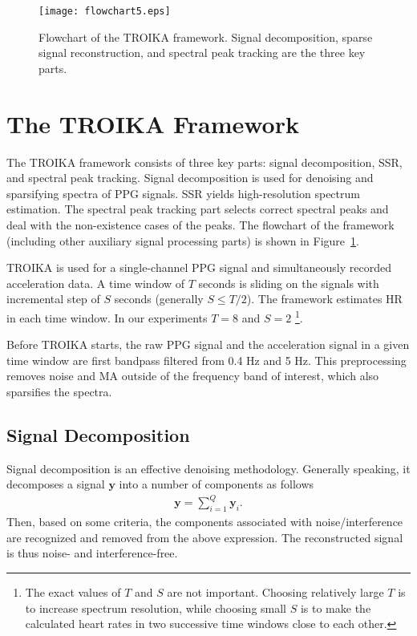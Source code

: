 \documentclass[10pt,twocolumn]{IEEEtran}
\begin{document}
\begin{figure}[t]
\centering
\texttt{[image: flowchart5.eps]}
\caption{Flowchart of the TROIKA framework. Signal decomposition, sparse signal reconstruction, and spectral peak tracking are the three key parts.}
\label{fig:framework}
\end{figure}









\section{The TROIKA Framework}
\label{sec:TROIKA}

The TROIKA framework consists of three key parts: signal decomposition, SSR, and spectral peak tracking. Signal decomposition is used for denoising and sparsifying spectra of PPG signals. SSR yields high-resolution spectrum estimation. The spectral peak tracking part selects correct spectral peaks and deal with the non-existence cases of the peaks. The flowchart of the framework (including other auxiliary signal processing parts) is shown in Figure~\ref{fig:framework}.


TROIKA is used for a single-channel PPG signal and simultaneously recorded acceleration data. A time window of $T$ seconds is sliding on the  signals with incremental step of $S$ seconds (generally $S \leq T/2$). The framework estimates HR in each time window. In our experiments $T=8$ and $S=2$ \footnote{The exact values of $T$ and $S$ are not important. Choosing relatively large $T$ is to increase spectrum resolution, while choosing small $S$ is to make the calculated heart rates in two successive time windows close to each other.}.

Before TROIKA starts, the raw PPG signal and the acceleration signal in a given time window are first bandpass filtered from 0.4 Hz and 5 Hz. This preprocessing removes noise and MA outside of the frequency band of interest, which also sparsifies the spectra.




\subsection{Signal Decomposition}

Signal decomposition is an effective denoising methodology. Generally speaking, it decomposes a signal $\mathbf{y}$ into a number of components as follows
\begin{eqnarray}
\mathbf{y} = \sum_{i=1}^Q \mathbf{y}_i.
\end{eqnarray}
Then, based on some criteria, the components associated with noise/interference are recognized and removed from the above expression. The reconstructed signal is thus noise- and interference-free.
\end{document}
